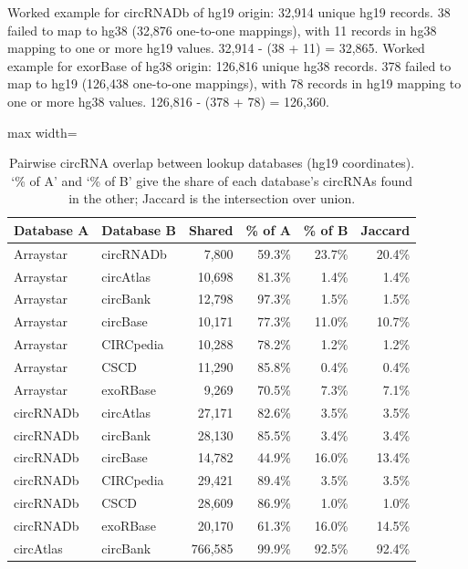 Worked example for circRNADb of hg19 origin: 32,914 unique hg19 records. 38 failed to map to hg38 (32,876 one-to-one mappings), with 11 records in hg38 mapping to one or more hg19 values. 32,914 - (38 + 11) = 32,865. Worked example for exorBase of hg38 origin: 126,816 unique hg38 records. 378 failed to map to hg19 (126,438 one-to-one mappings), with 78 records in hg19 mapping to one or more hg38 values. 126,816 - (378 + 78) = 126,360.

\clearpage

\begin{table}[ht]
  \centering
  \caption[Pairwise circRNA overlap between lookup databases (hg19 coordinates)]{Pairwise circRNA overlap between lookup databases (hg19 coordinates). `\% of A' and `\% of B' give the share of each database's circRNAs found in the other; Jaccard is the intersection over union.}
  \label{pycircsupptab3}
  \footnotesize
  \begin{adjustbox}{max width=\textwidth}
  \begin{tabular}{llrrrr}
    \toprule
    Database A & Database B & Shared & \% of A & \% of B & Jaccard \\
    \midrule
    Arraystar & circRNADb & 7,800 & 59.3\% & 23.7\% & 20.4\% \\
    Arraystar & circAtlas & 10,698 & 81.3\% & 1.4\% & 1.4\% \\
    Arraystar & circBank & 12,798 & 97.3\% & 1.5\% & 1.5\% \\
    Arraystar & circBase & 10,171 & 77.3\% & 11.0\% & 10.7\% \\
    Arraystar & CIRCpedia & 10,288 & 78.2\% & 1.2\% & 1.2\% \\
    Arraystar & CSCD & 11,290 & 85.8\% & 0.4\% & 0.4\% \\
    Arraystar & exoRBase & 9,269 & 70.5\% & 7.3\% & 7.1\% \\
    circRNADb & circAtlas & 27,171 & 82.6\% & 3.5\% & 3.5\% \\
    circRNADb & circBank & 28,130 & 85.5\% & 3.4\% & 3.4\% \\
    circRNADb & circBase & 14,782 & 44.9\% & 16.0\% & 13.4\% \\
    circRNADb & CIRCpedia & 29,421 & 89.4\% & 3.5\% & 3.5\% \\
    circRNADb & CSCD & 28,609 & 86.9\% & 1.0\% & 1.0\% \\
    circRNADb & exoRBase & 20,170 & 61.3\% & 16.0\% & 14.5\% \\
    circAtlas & circBank & 766,585 & 99.9\% & 92.5\% & 92.4\% \\

\end{tabular}
\end{adjustbox}
\end{table}
